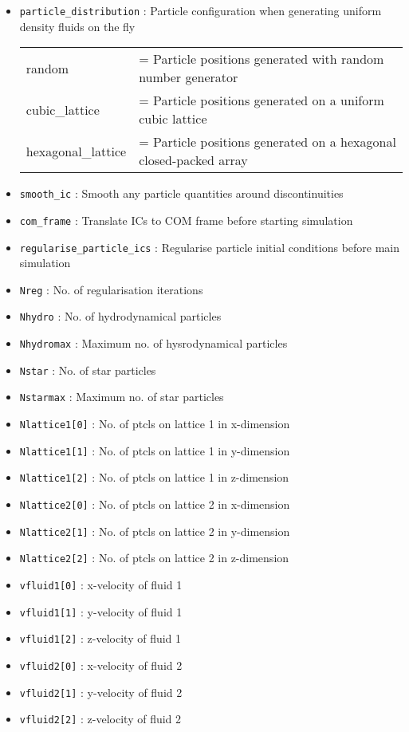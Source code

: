 \documentclass[a4paper]{article}
\newcommand{\var}[1]{\texttt{#1}}
\begin{document}
\begin{itemize}

\item \var{particle\_distribution} : Particle configuration when generating uniform density fluids on the fly \\
\begin{tabular}{ll}
random         &= Particle positions generated with random number generator \\
cubic\_lattice &= Particle positions generated on a uniform cubic lattice \\
hexagonal\_lattice &= Particle positions generated on a hexagonal closed-packed array
\end{tabular}

\item \var{smooth\_ic} : Smooth any particle quantities around discontinuities
\item \var{com\_frame} : Translate ICs to COM frame before starting simulation
\item \var{regularise\_particle\_ics} : Regularise particle initial conditions before main simulation
\item \var{Nreg}         : No. of regularisation iterations
\item \var{Nhydro}       : No. of hydrodynamical particles
\item \var{Nhydromax}    : Maximum no. of hysrodynamical particles
\item \var{Nstar}        : No. of star particles
\item \var{Nstarmax}     : Maximum no. of star particles

\item \var{Nlattice1[0]} : No. of ptcls on lattice 1 in x-dimension
\item \var{Nlattice1[1]} : No. of ptcls on lattice 1 in y-dimension
\item \var{Nlattice1[2]} : No. of ptcls on lattice 1 in z-dimension
\item \var{Nlattice2[0]} : No. of ptcls on lattice 2 in x-dimension
\item \var{Nlattice2[1]} : No. of ptcls on lattice 2 in y-dimension
\item \var{Nlattice2[2]} : No. of ptcls on lattice 2 in z-dimension

\item \var{vfluid1[0]}   : x-velocity of fluid 1
\item \var{vfluid1[1]}   : y-velocity of fluid 1
\item \var{vfluid1[2]}   : z-velocity of fluid 1
\item \var{vfluid2[0]}   : x-velocity of fluid 2
\item \var{vfluid2[1]}   : y-velocity of fluid 2
\item \var{vfluid2[2]}   : z-velocity of fluid 2


\end{itemize}
\end{document}
